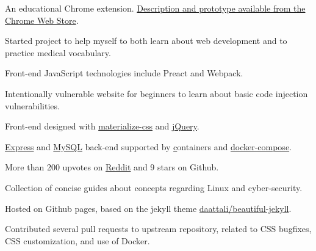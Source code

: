 

\begin{cventries}
  {
    \begin{cvitems}
      \item{An educational Chrome extension. \href{https://chrome.google.com/webstore/detail/mind-matter/ailffedpjgpjbdadlieaccchpcdiafjc}{Description and prototype available from the Chrome Web Store}.}
      \item{Started project to help myself to both learn about web development and to practice medical vocabulary.}
      \item{Front-end JavaScript technologies include Preact and Webpack.}
    \end{cvitems}
  }
  {
    \begin{cvitems}
      \item{Intentionally vulnerable website for beginners to learn about basic code injection vulnerabilities.}
      \item{Front-end designed with \href{http://materializecss.com/}{materialize-css} and \href{https://jquery.com/}{jQuery}.}
      \item{\href{https://expressjs.com/}{Express} and \href{https://www.mysql.com/}{MySQL} back-end supported by \href{Docker} containers and \href{https://docs.docker.com/compose/overview/}{docker-compose}.}
      \item{More than 200 upvotes on \href{https://www.reddit.com/r/HowToHack/comments/7zcfqd/i_made_an_easytohack_web_application_for/?ref=share&ref_source=link}{Reddit} and 9 stars on Github.}
    \end{cvitems}
  }
  {
    \begin{cvitems}
      \item{Collection of concise guides about concepts regarding Linux and cyber-security.}
      \item{Hosted on Github pages, based on the jekyll theme \href{https://github.com/daattali/beautiful-jekyll}{daattali/beautiful-jekyll}.}
      \item{Contributed several pull requests to upstream repository, related to CSS bugfixes, CSS customization, and use of Docker.}
    \end{cvitems}
  }

\end{cventries}
